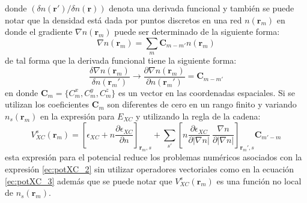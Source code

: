 \documentclass[12pt,a4paper, oneside]{book}
\begin{document}
   donde $ (\delta n(\pmb{r'})/\delta n(\pmb{r}))$ denota una derivada funcional y tambi\'en se puede notar que la densidad est\'a dada por puntos discretos en una red $n(\pmb{r}_m)$ en donde el gradiente $\nabla n(\pmb{r}_m) $ puede ser  determinado de la siguiente forma:
   \begin{equation}
   	\nabla n(\pmb{r}_m)= \sum_{m} \pmb{C}_{m-m'} n(\pmb{r}_m) \label{ec:gradDisc}
   \end{equation}  
   de tal forma que la derivada funcional tiene la siguiente forma:
   \begin{equation}
   \frac{\delta \nabla n(\pmb{r}_m)}{\delta n(\pmb{r}_m')} \rightarrow \frac{\partial \nabla n(\pmb{r}_m)}{\partial n(\pmb{r}_m')} = \pmb{C}_{m-m'} \label{ec:gradCmm}
   \end{equation}
   en donde $\pmb{C}_{m} = \{ C_m ^x , C_m ^y , C_m ^z  \}$  es un vector en las coordenadas espaciales. Si se utilizan los coeficientes $\pmb{C}_m$ son diferentes de cero en un rango finito y variando $n_s (\pmb{r}_m)$ en la expresi\'on para $E_{XC}$ y utilizando la regla de la cadena:
   \begin{equation}
   V_{XC}^s (\pmb{r}_m) = \left[\epsilon_{XC}+n \frac{\partial \epsilon_{XC}}{\partial n}\right]_{\pmb{r}_m, s} + \sum_{s'} \left[ n \frac{\partial \epsilon_{XC}}{\partial |\nabla n|} ~\frac{\nabla n}{\partial |\nabla n|}\right] _{\pmb{r}_m', s} \pmb{C}_{m'-m} \label{ec:potVxc}
   \end{equation}
   esta expresi\'on para el potencial reduce los problemas num\'ericos asociados con la expresi\'on \ref{ec:potXC_2} sin utilizar operadores vectoriales como en la ecuaci\'on \ref{ec:potXC_3} adem\'as que se puede notar que $V_{XC}^s (\pmb{r}_m)$ es una funci\'on no local de $n_s (\pmb{r}_m)$.
\end{document}
